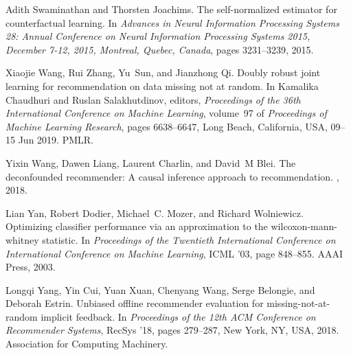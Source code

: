 \documentclass[manuscript,screen]{acmart}
\begin{document}
\begin{thebibliography}{10}
	Adith Swaminathan and Thorsten Joachims.
	\newblock The self-normalized estimator for counterfactual learning.
	\newblock In {\em Advances in Neural Information Processing Systems 28: Annual
		Conference on Neural Information Processing Systems 2015, December 7-12,
		2015, Montreal, Quebec, Canada}, pages 3231--3239, 2015.
	
	Xiaojie Wang, Rui Zhang, Yu~Sun, and Jianzhong Qi.
	\newblock Doubly robust joint learning for recommendation on data missing not
	at random.
	\newblock In Kamalika Chaudhuri and Ruslan Salakhutdinov, editors, {\em
		Proceedings of the 36th International Conference on Machine Learning},
	volume~97 of {\em Proceedings of Machine Learning Research}, pages
	6638--6647, Long Beach, California, USA, 09--15 Jun 2019. PMLR.
	
	Yixin Wang, Dawen Liang, Laurent Charlin, and David~M Blei.
	\newblock The deconfounded recommender: A causal inference approach to
	recommendation.
	, 2018.
	
	Lian Yan, Robert Dodier, Michael~C. Mozer, and Richard Wolniewicz.
	\newblock Optimizing classifier performance via an approximation to the
	wilcoxon-mann-whitney statistic.
	\newblock In {\em Proceedings of the Twentieth International Conference on
		International Conference on Machine Learning}, ICML '03, page 848--855.
	AAAI Press, 2003.
	
	Longqi Yang, Yin Cui, Yuan Xuan, Chenyang Wang, Serge Belongie, and Deborah
	Estrin.
	\newblock Unbiased offline recommender evaluation for missing-not-at-random
	implicit feedback.
	\newblock In {\em Proceedings of the 12th ACM Conference on Recommender
		Systems}, RecSys '18, pages 279--287, New York, NY, USA, 2018.
	Association for Computing Machinery.
	
\end{thebibliography}
\end{document}
